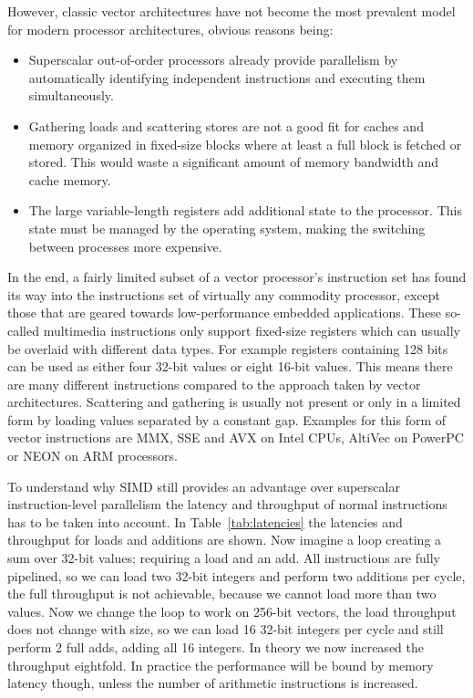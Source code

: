 However, classic vector architectures have not become the most prevalent model
for modern processor architectures, obvious reasons being:
\begin{itemize}
\item Superscalar out-of-order processors already provide parallelism by
automatically identifying independent instructions and executing them
simultaneously.
\item Gathering loads and scattering stores are not a good fit for caches and
memory organized in fixed-size blocks where at least a full block is fetched or
stored. This would waste a significant amount of memory bandwidth and cache
memory.
\item The large variable-length registers add additional state to the processor.
This state must be managed by the operating system, making the switching between
processes more expensive.
\end{itemize}

In the end, a fairly limited subset of a vector processor's instruction set has
found its way into the instructions set of virtually any commodity processor,
except those that are geared towards low-performance embedded applications.
These so-called multimedia instructions only support fixed-size registers which
can usually be overlaid with different data types. For example registers
containing 128 bits can be used as either four 32-bit values or eight 16-bit
values. This means there are many different instructions compared to the
approach taken by vector architectures.  Scattering and gathering is usually not
present or only in a limited form by loading values separated by a constant gap.
Examples for this form of vector instructions are MMX, SSE and AVX on Intel
CPUs, AltiVec on PowerPC or NEON on ARM processors.

To understand why SIMD still provides an advantage over superscalar
instruction-level parallelism the latency and throughput of normal instructions
has to be taken into account. In Table~\ref{tab:latencies} the latencies and
throughput for loads and additions are shown. Now imagine a loop creating a sum
over 32-bit values; requiring a load and an add. All instructions are fully
pipelined, so we can load two 32-bit integers and perform two additions per
cycle, the full throughput is not achievable, because we cannot load more than
two values. Now we change the loop to work on 256-bit vectors, the load
throughput does not change with size, so we can load 16 32-bit integers per cycle
and still perform 2 full adds, adding all 16 integers. In theory we now
increased the throughput eightfold. In practice the performance will be bound by
memory latency though, unless the number of arithmetic instructions is
increased.

